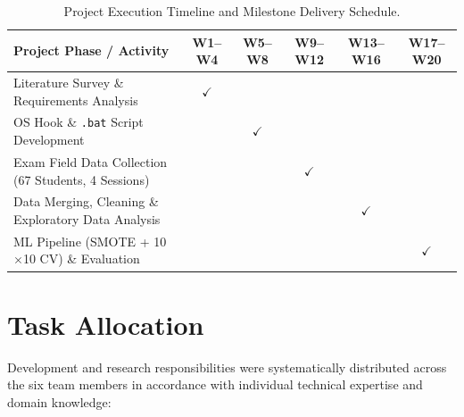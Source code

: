 \begin{table}[htbp]
    \centering
    \small
    \begin{tabular}{|p{4.5cm}|c|c|c|c|c|}
        \hline
        \textbf{Project Phase / Activity} & \textbf{W1--W4} & \textbf{W5--W8} & \textbf{W9--W12} & \textbf{W13--W16} & \textbf{W17--W20} \\ \hline
        Literature Survey \& Requirements Analysis & $\checkmark$ & & & & \\ \hline
        OS Hook \& \texttt{.bat} Script Development & & $\checkmark$ & & & \\ \hline
        Exam Field Data Collection (67 Students, 4 Sessions) & & & $\checkmark$ & & \\ \hline
        Data Merging, Cleaning \& Exploratory Data Analysis & & & & $\checkmark$ & \\ \hline
        ML Pipeline (SMOTE + 10$\times$10 CV) \& Evaluation & & & & & $\checkmark$ \\ \hline
    \end{tabular}
    \caption{Project Execution Timeline and Milestone Delivery Schedule.}
    \label{tab:gantt_schedule}
\end{table}

\section{Task Allocation}
\label{sec:task_allocation}

Development and research responsibilities were systematically distributed across the six team members in accordance with individual technical expertise and domain knowledge:

